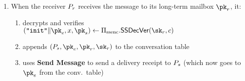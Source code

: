\begin{enumerate}
  \item When the receiver $P_r$ receives the message to its long-term mailbox
    $\pk_r$, it:
  \begin{enumerate}[nosep]
    \item decrypts and verifies\\ $(\texttt{``init''} \| \pk_e, x, \pk_s)  \leftarrow
    \sealedsenderencryptionscheme.\sealedsenderencryptionvdec(\sk_r, c)$
    \item appends $(\senders, \pk_e,
  \pk_r, \sk_r)$ to the conversation table
    \item uses {\bf Send Message} to send a delivery receipt to $P_s$ (which now goes to $\pk_e$ from the conv.\ table)
  \end{enumerate}
\end{enumerate}

